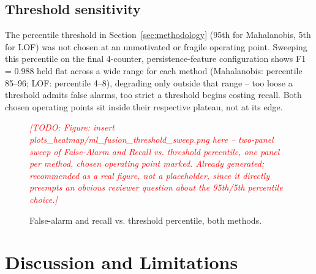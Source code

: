\documentclass[conference]{IEEEtran}
\newcommand{\todo}[1]{\textcolor{red}{\itshape [TODO: #1]}}
\begin{document}
\subsection{Threshold sensitivity}
\label{sec:threshold}

The percentile threshold in Section~\ref{sec:methodology} (95th for Mahalanobis, 5th for LOF) was not chosen at an unmotivated or fragile operating point. Sweeping this percentile on the final 4-counter, persistence-feature configuration shows F1 = 0.988 held flat across a wide range for each method (Mahalanobis: percentile 85--96; LOF: percentile 4--8), degrading only outside that range -- too loose a threshold admits false alarms, too strict a threshold begins costing recall. Both chosen operating points sit inside their respective plateau, not at its edge.

\begin{figure}[htbp]
\centering
\todo{Figure: insert plots\_heatmap/ml\_fusion\_threshold\_sweep.png here -- two-panel sweep of False-Alarm and Recall vs. threshold percentile, one panel per method, chosen operating point marked. Already generated; recommended as a real figure, not a placeholder, since it directly preempts an obvious reviewer question about the 95th/5th percentile choice.}
\caption{False-alarm and recall vs. threshold percentile, both methods.}
\label{fig:threshold}
\end{figure}

\section{Discussion and Limitations}
\label{sec:discussion}
\end{document}
